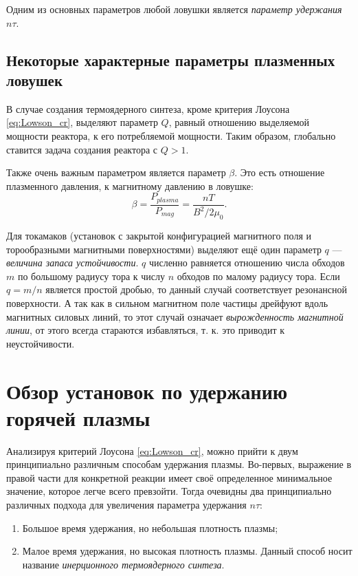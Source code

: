 Одним из основных параметров любой ловушки является \textit{параметр удержания} $n \tau$.


\subsection{Некоторые характерные параметры плазменных ловушек}

В случае создания термоядерного синтеза, кроме критерия Лоусона \eqref{eq:Lowson_cr}, выделяют параметр $Q$, равный отношению выделяемой мощности реактора, к его потребляемой мощности. Таким образом, глобально ставится задача создания реактора с $Q>1$.

Также очень важным параметром является параметр $\beta$. Это есть отношение плазменного давления, к магнитному давлению в ловушке:
\begin{equation}
\beta = \frac{P_{plasma}}{P_{mag}} = \frac{nT}{B^2/2 \mu_0}.
\end{equation}

Для токамаков (установок с закрытой конфигурацией магнитного поля и торообразными магнитными поверхностями) выделяют ещё один параметр $q$ --- \textit{величина запаса устойчивости}. $q$ численно равняется отношению числа обходов $m$ по большому радиусу тора к числу $n$ обходов по малому радиусу тора. Если $q = m/n$ является простой дробью, то данный случай соответствует резонансной поверхности. А так как в сильном магнитном поле частицы дрейфуют вдоль магнитных силовых линий, то этот случай означает \textit{вырожденность магнитной линии}, от этого всегда стараются избавляться, т. к. это приводит к неустойчивости. 

\section{Обзор установок по удержанию горячей плазмы}

Анализируя критерий Лоусона \eqref{eq:Lowson_cr}, можно прийти к двум принципиально различным способам удержания плазмы. Во-первых, выражение в правой части для конкретной реакции имеет своё определенное минимальное значение, которое легче всего превзойти. Тогда очевидны два принципиально различных подхода для увеличения параметра удержания $n \tau$:
\begin{enumerate}
\item Большое время удержания, но небольшая плотность плазмы;
\item Малое время удержания, но высокая плотность плазмы. Данный способ носит название \textit{инерционного термоядерного синтеза}.
\end{enumerate}

